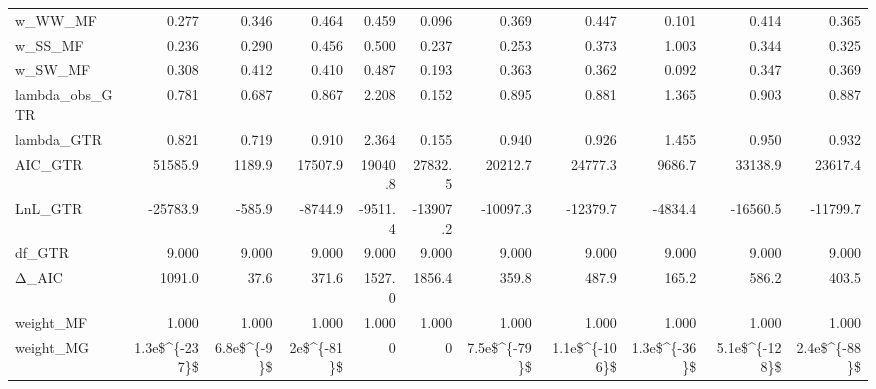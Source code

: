 \begin{tabular}{lrrrrrrrrrr}
w\_WW\_MF           &         0.277 &        0.346 &        0.464 &                  0.459 &                  0.096 &            0.369 &         0.447 &        0.101 &         0.414 &        0.365 \\
w\_SS\_MF           &         0.236 &        0.290 &        0.456 &                  0.500 &                  0.237 &            0.253 &         0.373 &        1.003 &         0.344 &        0.325 \\
w\_SW\_MF           &         0.308 &        0.412 &        0.410 &                  0.487 &                  0.193 &            0.363 &         0.362 &        0.092 &         0.347 &        0.369 \\
lambda\_obs\_GTR    &         0.781 &        0.687 &        0.867 &                  2.208 &                  0.152 &            0.895 &         0.881 &        1.365 &         0.903 &        0.887 \\
lambda\_GTR        &         0.821 &        0.719 &        0.910 &                  2.364 &                  0.155 &            0.940 &         0.926 &        1.455 &         0.950 &        0.932 \\
AIC\_GTR           &       51585.9 &       1189.9 &      17507.9 &                19040.8 &                27832.5 &          20212.7 &       24777.3 &       9686.7 &       33138.9 &      23617.4 \\
LnL\_GTR           &      -25783.9 &       -585.9 &      -8744.9 &                -9511.4 &               -13907.2 &         -10097.3 &      -12379.7 &      -4834.4 &      -16560.5 &     -11799.7 \\
df\_GTR            &         9.000 &        9.000 &        9.000 &                  9.000 &                  9.000 &            9.000 &         9.000 &        9.000 &         9.000 &        9.000 \\
Δ\_AIC             &        1091.0 &         37.6 &        371.6 &                 1527.0 &                 1856.4 &            359.8 &         487.9 &        165.2 &         586.2 &        403.5 \\
weight\_MF         &         1.000 &        1.000 &        1.000 &                  1.000 &                  1.000 &            1.000 &         1.000 &        1.000 &         1.000 &        1.000 \\
weight\_MG         & 1.3e\$\textasciicircum \{-237\}\$ &  6.8e\$\textasciicircum \{-9\}\$ &   2e\$\textasciicircum \{-81\}\$ &                      0 &                      0 &     7.5e\$\textasciicircum \{-79\}\$ & 1.1e\$\textasciicircum \{-106\}\$ & 1.3e\$\textasciicircum \{-36\}\$ & 5.1e\$\textasciicircum \{-128\}\$ & 2.4e\$\textasciicircum \{-88\}\$ \\

\end{tabular}
